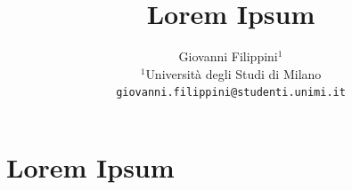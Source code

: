 \documentclass[8pt,a4paper]{article}
\title{\textbf{Lorem Ipsum}}
\author{Giovanni Filippini$^1$\vspace{3mm} \\
    $^1$Università degli Studi di Milano \\
    \texttt{giovanni.filippini@studenti.unimi.it}
}
\date{}
\begin{document}
\maketitle

\begin{abstract}
\end{abstract}


\section{Lorem Ipsum}





\end{document}
